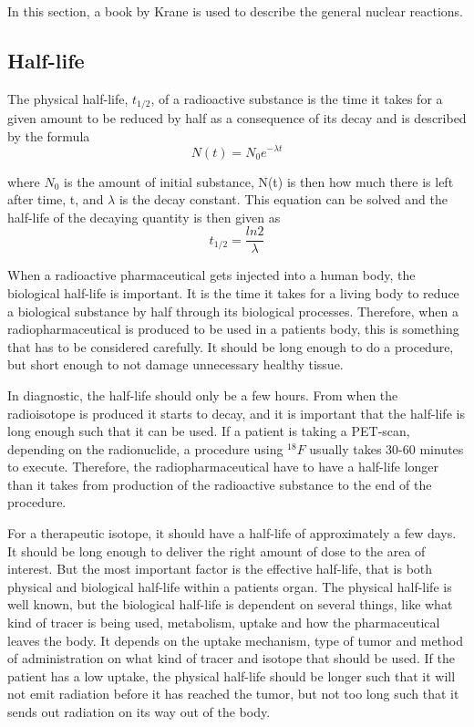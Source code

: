 \documentclass[twoside,english]{uiofysmaster/uiofysmaster}
\begin{document}
In this section, a book by Krane\cite{Krane} is used to describe the general nuclear reactions.



\subsection{Half-life}
The physical half-life, $t_{1/2}$, of a radioactive substance is the time it takes for a given amount to be reduced by half as a consequence of its decay and is described by the formula 
\begin{equation}
N(t) = N_0e^{-\lambda t} 
\end{equation}
 
where $N_0$ is the amount of initial substance, N(t) is then how much there is left after time, t, and $\lambda$ is the decay constant. This equation can be solved and the half-life of the decaying quantity is then given as
\begin{equation}
 t_{1/2} = \frac{ln2}{\lambda} 
\end{equation}


When a radioactive pharmaceutical gets injected into a human body, the biological half-life is important. It is the time it takes for a living body to reduce a biological substance by half through its biological processes. Therefore, when a radiopharmaceutical is produced to be used in a patients body, this is something that has to be considered carefully. It should be long enough to do a procedure, but short enough to not damage unnecessary healthy tissue. 

In diagnostic, the half-life should only be a few hours. From when the radioisotope is produced it starts to decay, and it is important that the half-life is long enough such that it can be used. If a patient is taking a PET-scan, depending on the radionuclide, a procedure using $^{18}F$ usually takes 30-60 minutes to execute. Therefore, the radiopharmaceutical have to have a half-life longer than it takes from production of the radioactive substance to the end of the procedure.


For a therapeutic isotope, it should have a half-life of approximately a few days. It should be long enough to deliver the right amount of dose to the area of interest. But the most important factor is the effective half-life, that is both physical and biological half-life within a patients organ\cite{Yeong}. The physical half-life is well known, but the biological half-life is dependent on several things, like what kind of tracer is being used, metabolism, uptake and how the pharmaceutical leaves the body\cite{Yeong}.
It depends on the uptake mechanism, type of tumor and method of administration\cite{Yeong} on what kind of tracer and isotope that should be used. If the patient has a low uptake, the physical half-life should be longer such that it will not emit radiation before it has reached the tumor, but not too long such that it sends out radiation on its way out of the body. 
\end{document}
